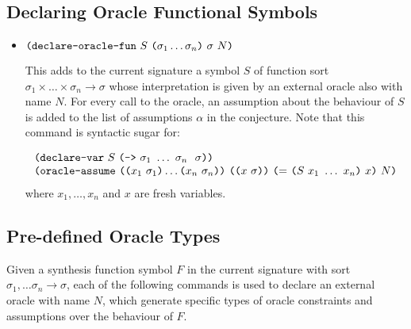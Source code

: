 \documentclass[english,a4paper,10pt]{article}
\begin{document}
\subsection{Declaring Oracle Functional Symbols}

\begin{itemize}
\item $\texttt{(}\texttt{declare-oracle-fun}\mbox{ }S\mbox{ } \texttt{(}\sigma_1 \ldots \sigma_n\texttt{)}\mbox{ }\sigma \mbox{ } N\texttt{)}$

This adds to the current signature a symbol $S$ of function sort 
$\sigma_1 \times \ldots \times \sigma_n \rightarrow \sigma$
whose interpretation is given by an external oracle also with name $N$. 
For every call to the oracle, an assumption about the behaviour of $S$ is added to the list of assumptions $\alpha$ in the conjecture.
Note that this command is syntactic sugar for:

\[
\begin{array}{l}
\texttt{(}\texttt{declare-var}\mbox{ }S \mbox{ }\texttt{(}\texttt{->}\mbox{ }  \sigma_1\mbox{ } \ldots\mbox{ } \sigma_n\mbox{ } \mbox{ }\sigma\texttt{)}\texttt{)}\\
\texttt{(}\texttt{oracle-assume}\mbox{ }
\texttt{(}\texttt{(}x_1\mbox{ }\sigma_1\texttt{)} \ldots \texttt{(}x_n\mbox{ }\sigma_n\texttt{)}\texttt{)}\mbox{ }
\texttt{(}\texttt{(}x \mbox{ }\sigma\texttt{)}\texttt{)}  \mbox{ } 
\texttt{(}{\tt=}\mbox{ } \texttt{(}S \mbox{ } x_1 \mbox{ } \ldots \mbox{ } x_n\texttt{)}\mbox{ } x \texttt{)}\mbox{ } N 
\texttt{)}
\end{array}
\]
where $x_1, \ldots, x_n$ and $x$ are fresh variables.
\end{itemize}


\subsection{Pre-defined Oracle Types}
Given a synthesis function symbol $F$ in the current signature
with sort $\sigma_1, \ldots \sigma_n \rightarrow \sigma$, each of the following commands 
is used to declare an external oracle with name $N$, which generate specific types of oracle constraints and assumptions over the behaviour of $F$. 
\end{document}
